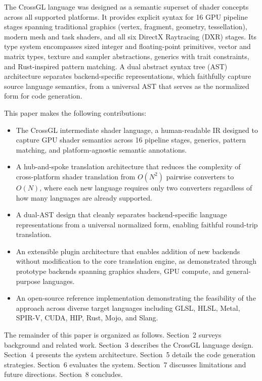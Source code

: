 \documentclass{svproc}
\begin{document}
The CrossGL language was designed as a semantic superset of shader concepts across all supported platforms. It provides explicit syntax for 16 GPU pipeline stages spanning traditional graphics (vertex, fragment, geometry, tessellation), modern mesh and task shaders, and all six DirectX Raytracing (DXR) stages. Its type system encompasses sized integer and floating-point primitives, vector and matrix types, texture and sampler abstractions, generics with trait constraints, and Rust-inspired pattern matching. A dual abstract syntax tree (AST) architecture separates backend-specific representations, which faithfully capture source language semantics, from a universal AST that serves as the normalized form for code generation.

This paper makes the following contributions:

\begin{itemize}
    \item The CrossGL intermediate shader language, a human-readable IR designed to capture GPU shader semantics across 16 pipeline stages, generics, pattern matching, and platform-agnostic semantic annotations.
    \item A hub-and-spoke translation architecture that reduces the complexity of cross-platform shader translation from $O(N^2)$ pairwise converters to $O(N)$, where each new language requires only two converters regardless of how many languages are already supported.
    \item A dual-AST design that cleanly separates backend-specific language representations from a universal normalized form, enabling faithful round-trip translation.
    \item An extensible plugin architecture that enables addition of new backends without modification to the core translation engine, as demonstrated through prototype backends spanning graphics shaders, GPU compute, and general-purpose languages.
    \item An open-source reference implementation demonstrating the feasibility of the approach across diverse target languages including GLSL, HLSL, Metal, SPIR-V, CUDA, HIP, Rust, Mojo, and Slang.
\end{itemize}

The remainder of this paper is organized as follows. Section~2 surveys background and related work. Section~3 describes the CrossGL language design. Section~4 presents the system architecture. Section~5 details the code generation strategies. Section~6 evaluates the system. Section~7 discusses limitations and future directions. Section~8 concludes.
\end{document}

